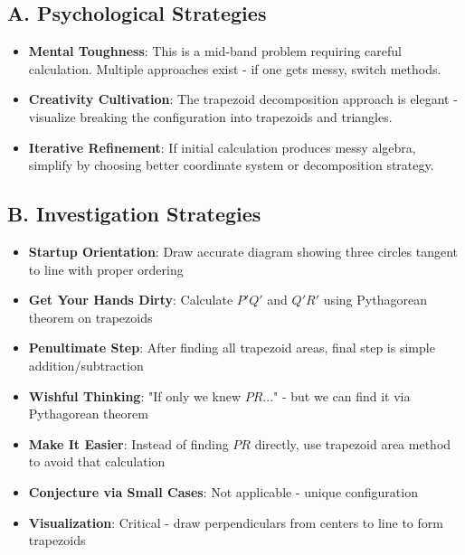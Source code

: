 \documentclass[]{article}
\begin{document}
\begin{strategicbox}
\subsection*{A. Psychological Strategies}
\begin{itemize}[leftmargin=*]
    \item \textbf{Mental Toughness}: This is a mid-band problem requiring careful calculation. Multiple approaches exist - if one gets messy, switch methods.
    \item \textbf{Creativity Cultivation}: The trapezoid decomposition approach is elegant - visualize breaking the configuration into trapezoids and triangles.
    \item \textbf{Iterative Refinement}: If initial calculation produces messy algebra, simplify by choosing better coordinate system or decomposition strategy.
\end{itemize}

\subsection*{B. Investigation Strategies}
\begin{itemize}[leftmargin=*]
    \item \textbf{Startup Orientation}: Draw accurate diagram showing three circles tangent to line with proper ordering
    \item \textbf{Get Your Hands Dirty}: Calculate $P'Q'$ and $Q'R'$ using Pythagorean theorem on trapezoids
    \item \textbf{Penultimate Step}: After finding all trapezoid areas, final step is simple addition/subtraction
    \item \textbf{Wishful Thinking}: "If only we knew $PR$..." - but we can find it via Pythagorean theorem
    \item \textbf{Make It Easier}: Instead of finding $PR$ directly, use trapezoid area method to avoid that calculation
    \item \textbf{Conjecture via Small Cases}: Not applicable - unique configuration
    \item \textbf{Visualization}: Critical - draw perpendiculars from centers to line to form trapezoids
\end{itemize}


\end{strategicbox}
\end{document}
